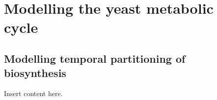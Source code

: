 \chapter{Modelling the yeast metabolic cycle}

\section{Modelling temporal partitioning of biosynthesis}

Insert content here.
